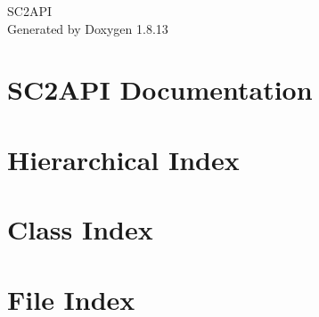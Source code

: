 \documentclass[twoside]{book}
\newcommand{\+}{\discretionary{\mbox{\scriptsize$\hookleftarrow$}}{}{}}
\newcommand{\clearemptydoublepage}{%
  \newpage{\pagestyle{empty}\cleardoublepage}%
}
\begin{document}
\hypersetup{pageanchor=false,
             bookmarksnumbered=true,
             pdfencoding=unicode
            }
\begin{titlepage}
\vspace*{7cm}
\begin{center}%
{\Large S\+C2\+A\+PI }\\
\vspace*{1cm}
{\large Generated by Doxygen 1.8.13}\\
\end{center}
\end{titlepage}
\clearemptydoublepage
{}
\tableofcontents
\clearemptydoublepage
{}
\hypersetup{pageanchor=true}

\chapter{S\+C2\+A\+PI Documentation}
\label{index}\hypertarget{index}{}
\chapter{Hierarchical Index}

\chapter{Class Index}

\chapter{File Index}

\end{document}
